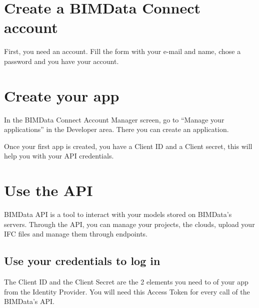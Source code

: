 \documentclass[a4paper,12pt,english]{sphinxmanual}
\begin{document}
\section{Create a BIMData Connect account}
\label{\detokenize{tutorials/getting_started:create-a-bimdata-connect-account}}
First, you need an account.
Fill the form with your e-mail and name, chose a password and you have your account.



\section{Create your app}
\label{\detokenize{tutorials/getting_started:create-your-app}}
In the BIMData Connect Account Manager screen, go to “Manage your applications” in the Developer area.
There you can create an application.


Once your first app is created, you have a Client ID and a Client secret, this will help you with your API credentials.



\section{Use the API}
\label{\detokenize{tutorials/getting_started:use-the-api}}
BIMData API is a tool to interact with your models stored on BIMData’s servers.
Through the API, you can manage your projects, the clouds, upload your IFC files and manage them through endpoints.


\subsection{Use your credentials to log in}
\label{\detokenize{tutorials/getting_started:use-your-credentials-to-log-in}}
The Client ID and the Client Secret are the 2 elements you need to  of your app from the Identity Provider.
You will need this Access Token for every call of the BIMData’s API.
\end{document}
